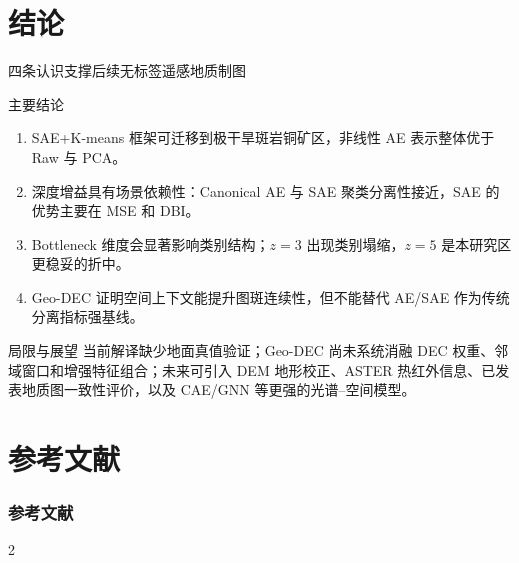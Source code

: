 \documentclass[10pt,aspectratio=169]{beamer}
\begin{document}
\section{结论}

\begin{frame}{四条认识支撑后续无标签遥感地质制图}
  \small
  \begin{block}{主要结论}
    \begin{enumerate}
      \item SAE+K-means 框架可迁移到极干旱斑岩铜矿区，非线性 AE 表示整体优于 Raw 与 PCA。
      \item 深度增益具有场景依赖性：Canonical AE 与 SAE 聚类分离性接近，SAE 的优势主要在 MSE 和 DBI。
      \item Bottleneck 维度会显著影响类别结构；$z=3$ 出现类别塌缩，$z=5$ 是本研究区更稳妥的折中。
      \item Geo-DEC 证明空间上下文能提升图斑连续性，但不能替代 AE/SAE 作为传统分离指标强基线。
    \end{enumerate}
  \end{block}
  \begin{block}{局限与展望}
    \scriptsize
    当前解译缺少地面真值验证；Geo-DEC 尚未系统消融 DEC 权重、邻域窗口和增强特征组合；未来可引入 DEM 地形校正、ASTER 热红外信息、已发表地质图一致性评价，以及 CAE/GNN 等更强的光谱--空间模型。
  \end{block}
\end{frame}

\section{参考文献}
\begin{frame}[t]
  \frametitle{参考文献}
  \scriptsize
  \setlength{\columnsep}{1.8em}
  \begin{multicols}{2}
    \nocite{*}
    
    
  \end{multicols}
\end{frame}
\end{document}
